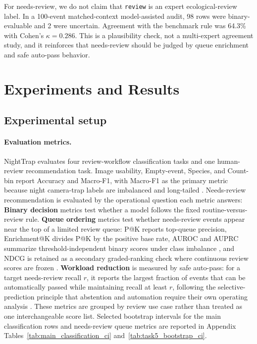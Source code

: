 \documentclass{article}
\begin{document}
For needs-review, we do not claim that \texttt{review} is an expert ecological-review label. In a 100-event matched-context model-assisted audit, 98 rows were binary-evaluable and 2 were uncertain. Agreement with the benchmark rule was 64.3\% with Cohen's $\kappa=0.286$. This is a plausibility check, not a multi-expert agreement study, and it reinforces that needs-review should be judged by queue enrichment and safe auto-pass behavior.




\section{Experiments and Results}
\label{sec:experiments_results}

\subsection{Experimental setup}

\paragraph{Evaluation metrics.}
NightTrap evaluates four review-workflow classification tasks and one human-review recommendation task. Image usability, Empty-event, Species, and Count-bin report Accuracy and Macro-F1, with Macro-F1 as the primary metric because night camera-trap labels are imbalanced and long-tailed \citep{lin2017focalloss,gupta2019lvis}. Needs-review recommendation is evaluated by the operational question each metric answers:
\textbf{Binary decision} metrics test whether a model follows the fixed routine-versus-review rule. \textbf{Queue ordering} metrics test whether needs-review events appear near the top of a limited review queue: P@K reports top-queue precision, Enrichment@K divides P@K by the positive base rate, AUROC and AUPRC summarize threshold-independent binary scores under class imbalance \citep{davis2006prroc}, and NDCG is retained as a secondary graded-ranking check where continuous review scores are frozen \citep{jarvelin2002ndcg}. \textbf{Workload reduction} is measured by safe auto-pass: for a target needs-review recall $r$, it reports the largest fraction of events that can be automatically passed while maintaining recall at least $r$, following the selective-prediction principle that abstention and automation require their own operating analysis \citep{geifman2017selective}. These metrics are grouped by review use case rather than treated as one interchangeable score list. Selected bootstrap intervals for the main classification rows and needs-review queue metrics are reported in Appendix Tables~\ref{tab:main_classification_ci} and~\ref{tab:task5_bootstrap_ci}.
\end{document}
